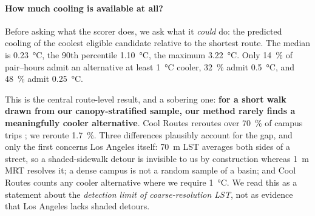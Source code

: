 \documentclass[10pt]{article}   %
\begin{document}
\paragraph{How much cooling is available at all?}
Before asking what the scorer does, we ask what it \emph{could} do: the predicted cooling of
the coolest eligible candidate relative to the shortest route. The median is
\SI{0.23}{\celsius}, the 90th percentile \SI{1.10}{\celsius}, the maximum
\SI{3.22}{\celsius}. Only \SI{14}{\percent} of pair--hours admit an alternative at least
\SI{1}{\celsius} cooler, \SI{32}{\percent} admit \SI{0.5}{\celsius}, and \SI{48}{\percent}
admit \SI{0.25}{\celsius}.

This is the central route-level result, and a sobering one: \textbf{for a short walk drawn
from our canopy-stratified sample, our method rarely finds a meaningfully cooler
alternative}. Cool
Routes reroutes over \SI{70}{\percent} of campus trips \citep{buo2026coolroutes}; we reroute
\SI{1.7}{\percent}. Three differences plausibly account for the gap, and only the first
concerns Los Angeles itself: \SI{70}{\metre} LST averages both sides of a street, so a
shaded-sidewalk detour is invisible to us by construction whereas \SI{1}{\metre} MRT resolves
it; a dense campus is not a random sample of a basin; and Cool Routes counts any cooler
alternative where we require \SI{1}{\celsius}. We read this as a statement about the
\emph{detection limit of coarse-resolution LST}, not as evidence that Los Angeles lacks
shaded detours.
\end{document}
